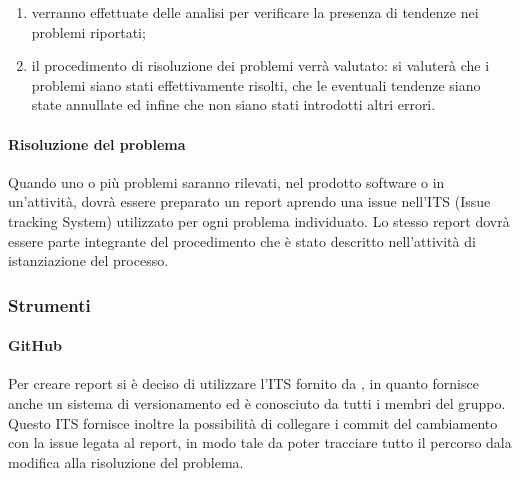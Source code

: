\begin{enumerate}
				\item verranno effettuate delle analisi per verificare la presenza di tendenze nei problemi riportati;

				\item il procedimento di risoluzione dei problemi verrà valutato: si valuterà che i problemi siano stati effettivamente risolti, che le eventuali tendenze siano state annullate ed infine che non siano stati introdotti altri errori.
			\end{enumerate}
		\paragraph{Risoluzione del problema}
			Quando uno o più problemi saranno rilevati, nel prodotto software o in un'attività, dovrà essere preparato un report aprendo una issue nell'ITS (Issue tracking System) utilizzato per ogni problema individuato. Lo stesso report dovrà essere parte integrante del procedimento che è stato descritto nell'attività di istanziazione del processo.
	\subsubsection{Strumenti}
		\paragraph{GitHub}
			Per creare report si è deciso di utilizzare l'ITS fornito da , in quanto fornisce anche un sistema di versionamento ed è conosciuto da tutti i membri del gruppo.
			Questo ITS fornisce inoltre la possibilità di collegare i commit del cambiamento con la issue legata al report, in modo tale da poter tracciare tutto il percorso dala modifica alla risoluzione del problema.
